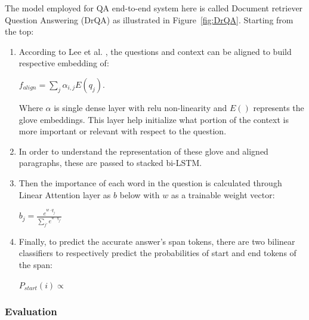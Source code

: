 The model employed for QA end-to-end system here is called Document retriever Question Answering (DrQA) as illustrated in Figure~\ref{fig:DrQA}.  Starting from the top:
\begin{enumerate}
    \item According to Lee et al. \cite{}, the questions and context can be aligned to build respective embedding of: 
    \begin{center} $f_{align} = \sum_j \alpha_{i, j} E(q_j)$. \end{center}
    
    Where $\alpha$ is single dense layer with relu non-linearity and $E()$ represents the glove embeddings. This layer help initialize what portion of the context is more important or relevant with respect to the question.
    
    \item In order to understand the representation of these glove and aligned paragraphs, these are passed to stacked bi-LSTM. 
    
    \item Then the importance of each word in the question is calculated through Linear Attention layer as $b$ below with $w$ as a trainable weight vector:
    \begin{center} 
    $b_j = \frac{e^{w \cdot q_j}}{\sum_{j'}e^{w\cdot q_{j'}}}$
    \end{center}
    
    \item Finally, to predict the accurate answer's span tokens, there are two bilinear classifiers to respectively predict the probabilities of start and end tokens of the span: 
    \begin{center} 
    $P_{start}(i) \propto $
    \end{center}
    
    
\end{enumerate}





\subsubsection{Evaluation}

